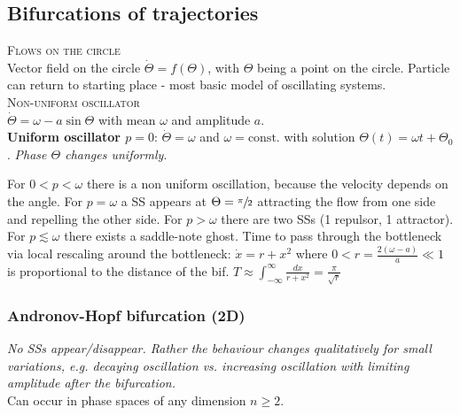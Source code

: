 \subsection{Bifurcations of trajectories}
\textsc{Flows on the circle}\\
Vector field on the circle $\dot{\Theta}=f(\Theta)$, with $\Theta$ being a point on the circle. Particle can return to starting place - most basic model of oscillating systems.\\

\textsc{Non-uniform oscillator}\\
$\dot{\Theta} = \omega - a\sin \Theta$ with mean $\omega$ and amplitude $a$.\\
\textbf{Uniform oscillator $p=0$}: $\dot{\Theta} = \omega$ and $\omega=\text{const.}$ with solution $\Theta(t)=\omega t + \Theta_0$. \emph{Phase $\Theta$ changes uniformly}.\\
\begin{center}
\end{center}

For $0<p<\omega$ there is a non uniform oscillation, because the velocity depends on the angle. For $p=\omega$ a SS appears at $\Theta=\sfrac{\pi}{2}$ attracting the flow from one side and repelling the other side. For $p>\omega$ there are two SSs (1 repulsor, 1 attractor).\\
For $p\lesssim\omega$ there exists a saddle-note ghost. Time to pass through the bottleneck via local rescaling around the bottleneck: $\dot{x}=r+x^2$ where $0<r = \frac{2(\omega-a)}{a}\ll 1$ is proportional to the distance of the bif. $T\approx
\int_{-\infty}^{\infty} \frac{dx}{r+x^2} = \frac{\pi}{\sqrt{r}}$



\subsubsection{Andronov-Hopf bifurcation (2D)}
\emph{No SSs appear/disappear. Rather the behaviour changes qualitatively for small variations, e.g. decaying oscillation vs. increasing oscillation with limiting amplitude after the bifurcation.}\\
Can occur in phase spaces of any dimension $n\geq 2$.

